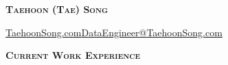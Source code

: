 \documentclass[12pt]{article}
\begin{document}
\noindent
\centering

\begin{LARGE}

	\textsc{\textbf{Taehoon
			(Tae) Song}}

\end{LARGE}

\vspace{1mm}

\begin{small}
	\qquad
	\href{https://taehoonsong.com}{TaehoonSong.com}\qquad\textbar\qquad\href{mailto:DataEngineer@TaehoonSong.com}{DataEngineer@TaehoonSong.com}\qquad\textbar{}\ \qquad
\end{small}

\raggedright

\vspace{1mm}



\hrulefill

\begin{large}
  \textsc{\textbf{Current Work Experience}}
  \vspace{-3mm}
\end{large}

\textcolor{lightgray}{\hrulefill}\\
\end{document}
